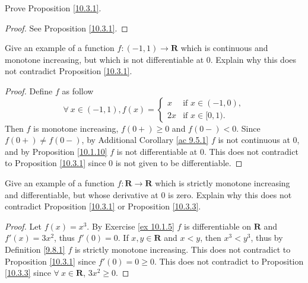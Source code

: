 \exercisesection

\begin{exercise}\label{ex 10.3.1}
    Prove Proposition \ref{10.3.1}.
\end{exercise}

\begin{proof}
    See Proposition \ref{10.3.1}.
\end{proof}

\begin{exercise}\label{ex 10.3.2}
    Give an example of a function \(f : (-1, 1) \to \mathbf{R}\) which is continuous and monotone increasing, but which is not differentiable at \(0\).
    Explain why this does not contradict Proposition \ref{10.3.1}.
\end{exercise}

\begin{proof}
    Define \(f\) as follow
    \[
        \forall\ x \in (-1, 1), f(x) = \begin{cases}
            x  & \text{if } x \in (-1, 0), \\
            2x & \text{if } x \in [0, 1).
        \end{cases}
    \]
    Then \(f\) is monotone increasing, \(f(0+) \geq 0\) and \(f(0-) < 0\).
    Since \(f(0+) \neq f(0-)\), by Additional Corollary \ref{ac 9.5.1} \(f\) is not continuous at \(0\), and by Proposition \ref{10.1.10} \(f\) is not differentiable at \(0\).
    This does not contradict to Proposition \ref{10.3.1} since \(0\) is not given to be differentiable.
\end{proof}

\begin{exercise}\label{ex 10.3.3}
    Give an example of a function \(f : \mathbf{R} \to \mathbf{R}\) which is strictly monotone increasing and differentiable, but whose derivative at \(0\) is zero.
    Explain why this does not contradict Proposition \ref{10.3.1} or Proposition \ref{10.3.3}.
\end{exercise}

\begin{proof}
    Let \(f(x) = x^3\).
    By Exercise \ref{ex 10.1.5} \(f\) is differentiable on \(\mathbf{R}\) and \(f'(x) = 3x^2\), thus \(f'(0) = 0\).
    If \(x, y \in \mathbf{R}\) and \(x < y\), then \(x^3 < y^3\), thus by Definition \ref{9.8.1} \(f\) is strictly monotone increasing.
    This does not contradict to Proposition \ref{10.3.1} since \(f'(0) = 0 \geq 0\).
    This does not contradict to Proposition \ref{10.3.3} since \(\forall\ x \in \mathbf{R}\), \(3x^2 \geq 0\).
\end{proof}

